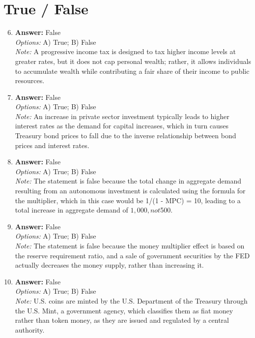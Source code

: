 \documentclass[12pt]{article}
\begin{document}
\section*{True / False}
\begin{enumerate}[label=\arabic*.]
\setcounter{enumi}{5}
\item \textbf{Answer:} False
\\ \textit{Options:} A) True; B) False
\\ \textit{Note:} A progressive income tax is designed to tax higher income levels at greater rates, but it does not cap personal wealth; rather, it allows individuals to accumulate wealth while contributing a fair share of their income to public resources.
\item \textbf{Answer:} False
\\ \textit{Options:} A) True; B) False
\\ \textit{Note:} An increase in private sector investment typically leads to higher interest rates as the demand for capital increases, which in turn causes Treasury bond prices to fall due to the inverse relationship between bond prices and interest rates.
\item \textbf{Answer:} False
\\ \textit{Options:} A) True; B) False
\\ \textit{Note:} The statement is false because the total change in aggregate demand resulting from an autonomous investment is calculated using the formula for the multiplier, which in this case would be 1/(1 - MPC) = 10, leading to a total increase in aggregate demand of $1,000, not $500.
\item \textbf{Answer:} False
\\ \textit{Options:} A) True; B) False
\\ \textit{Note:} The statement is false because the money multiplier effect is based on the reserve requirement ratio, and a sale of government securities by the FED actually decreases the money supply, rather than increasing it.
\item \textbf{Answer:} False
\\ \textit{Options:} A) True; B) False
\\ \textit{Note:} U.S. coins are minted by the U.S. Department of the Treasury through the U.S. Mint, a government agency, which classifies them as fiat money rather than token money, as they are issued and regulated by a central authority.
\end{enumerate}
\end{document}
